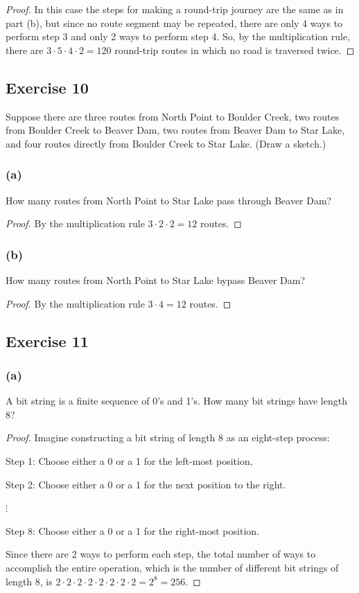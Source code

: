 \documentclass[14pt]{extarticle}
\newcommand{\cy}{\color{cyan}}
\begin{document}
\begin{proof}
In this case the steps for making a round-trip journey are the same as in part (b), but since no route segment may be 
repeated, there are only 4 ways to perform step 3 and only 2 ways to perform step 4. So, by the multiplication rule, 
there are \(3 \cdot 5 \cdot 4 \cdot 2 = 120\) round-trip routes in which no road is traversed twice.
\end{proof}

\subsection{Exercise 10}
Suppose there are three routes from North Point to Boulder Creek, two routes from Boulder Creek to Beaver Dam, two 
routes from Beaver Dam to Star Lake, and four routes directly from Boulder Creek to Star Lake. (Draw a sketch.)

\subsubsection{(a)}
How many routes from North Point to Star Lake pass through Beaver Dam?

\begin{proof}
By the multiplication rule \(3 \cdot 2 \cdot 2 = 12\) routes.
\end{proof}

\subsubsection{(b)}
How many routes from North Point to Star Lake bypass Beaver Dam?

\begin{proof}
By the multiplication rule \(3 \cdot 4 = 12\) routes.
\end{proof}

\subsection{Exercise 11}
\subsubsection{(a)}
A bit string is a finite sequence of 0’s and 1’s. How many bit strings have length 8?

\begin{proof}
Imagine constructing a bit string of length 8 as an eight-step process:

{\cy Step 1:} Choose either a 0 or a 1 for the left-most position,

{\cy Step 2:} Choose either a 0 or a 1 for the next position to the right.

\(\vdots\)

{\cy Step 8:} Choose either a 0 or a 1 for the right-most position.

Since there are 2 ways to perform each step, the total number of ways to accomplish the entire operation, which is 
the number of different bit strings of length 8, is \(2 \cdot 2 \cdot 2 \cdot 2 \cdot 2 \cdot 2 \cdot 2 \cdot 2 = 
2^8 = 256\).
\end{proof}
\end{document}
